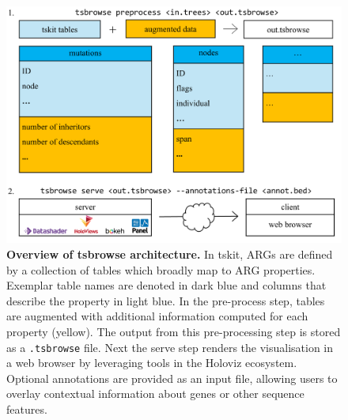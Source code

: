 \documentclass[unnumsec,webpdf,contemporary,large,namedate]{oup-authoring-template}%
\begin{document}
\begin{figure} \centering
\includegraphics[width=0.95\linewidth]{figures/MainFig1.png}
\caption{\textbf{Overview of tsbrowse architecture. } In tskit, ARGs are
defined by a collection of tables which broadly map to ARG properties. Exemplar
table names are denoted in dark blue and columns that describe the property in
light blue. In the pre-process step, tables are augmented with additional
information computed for each property (yellow). The output from this
pre-processing step is stored as a \texttt{.tsbrowse} file. Next the serve step
renders the visualisation in a web browser by leveraging tools in the Holoviz
ecosystem. Optional annotations are provided as an input file, allowing users
to overlay contextual information about genes or other sequence features. }
\label{fig:Figure_1} \end{figure}
\end{document}
